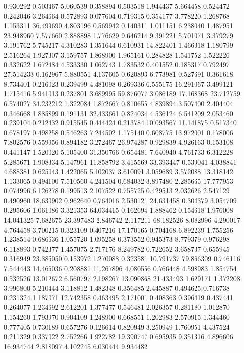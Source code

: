 0.930292
0.503467
5.060539
0.358894
0.503518
1.944437
5.664458
0.524472
0.242046
3.264664
0.572893
0.077604
0.719315
0.354177
3.778220
1.268768
1.153311
36.499690
4.803196
0.569942
0.140311
1.011151
6.238040
1.487951
23.948960
7.577660
2.888898
1.776629
9.646214
9.391221
5.701071
3.379279
3.191762
5.745217
4.310283
1.351644
0.610931
14.822401
1.466318
1.180799
2.516264
1.927307
3.159757
1.868900
1.965161
0.284828
1.541752
1.522226
0.332622
1.672484
4.533330
1.062743
1.783532
0.401552
0.185317
0.792497
27.514233
0.162967
5.880551
4.137605
0.620893
6.773981
0.527691
0.361618
8.734401
0.216023
0.239499
4.481098
0.269336
6.555175
16.291067
3.499121
1.715416
5.941013
0.237801
3.689995
59.876077
3.086189
17.168368
23.712759
6.574027
34.232212
1.322084
1.872667
0.810655
4.839894
3.507400
2.404404
0.346668
1.885899
0.191131
32.433661
0.824034
4.536124
6.541209
2.053460
0.239104
0.212432
0.915545
0.444424
0.213784
10.093567
11.141875
0.517340
0.678197
0.498258
0.546263
7.244502
1.175140
0.608775
13.972001
0.178006
7.802576
0.559956
0.894182
3.272467
26.974287
0.929839
4.926163
0.153108
0.441147
1.520020
5.105400
31.350766
0.654481
7.640940
4.761733
6.312228
5.285671
1.908334
5.147961
11.858792
3.415569
33.393447
0.539041
4.038841
4.688381
0.625043
1.422065
5.102037
3.610091
3.059689
3.572088
13.318142
1.133065
0.494100
7.510560
4.241504
0.684032
3.897480
2.285665
17.777953
0.074996
6.126278
0.199513
2.107522
0.755725
0.429513
2.032626
2.547129
0.490960
18.630902
0.962640
0.764016
2.530121
24.631458
0.304379
3.054709
0.295606
1.061086
3.321353
64.034415
0.162694
1.888462
0.154618
1.976008
14.041325
7.682675
23.397483
2.846742
2.117211
68.182526
8.082996
4.290017
4.764458
3.700215
0.323109
0.407216
17.170165
0.704168
6.892239
1.755256
1.238514
0.686636
1.055720
1.095258
0.373552
0.945373
8.779379
0.976298
6.118893
0.742377
1.457075
2.717176
8.249782
0.722652
3.658737
0.655945
0.316949
23.385050
0.153972
1.270088
0.323581
10.791737
79.866309
0.746116
7.544443
14.466036
0.208881
11.267896
4.080556
0.766448
4.598983
1.854754
0.532526
13.012672
6.560797
2.198267
13.090868
21.433493
1.629171
1.372208
3.996800
5.210444
3.118812
1.482348
0.356485
2.445887
0.494625
0.716738
0.231324
1.187071
12.742358
0.463495
2.171001
0.408363
0.396419
0.437441
0.264077
1.234692
2.612201
1.377477
0.546481
2.026357
0.281180
1.012870
1.154260
1.793970
0.904109
1.248900
0.668551
1.202983
2.570915
1.344460
0.777405
0.730189
0.657276
0.126614
0.820949
3.250949
1.760951
4.437524
0.211329
0.337022
2.752266
1.922782
19.390747
0.695935
9.351316
4.896606
16.934744
2.818097
4.102245
6.030444
9.934482
